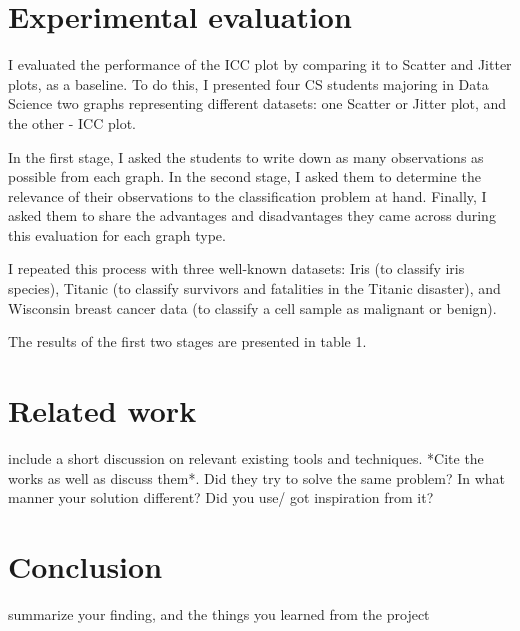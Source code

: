 \documentclass[12pt]{article}
\begin{document}
\section{Experimental evaluation}\label{Experimental evaluation}
I evaluated the performance of the ICC plot by comparing it to Scatter and Jitter plots, as a baseline. To do this, I presented four CS students majoring in Data Science two graphs representing different datasets: one Scatter or Jitter plot, and the other - ICC plot.

In the first stage, I asked the students to write down as many observations as possible from each graph. In the second stage, I asked them to determine the relevance of their observations to the classification problem at hand. Finally, I asked them to share the advantages and disadvantages they came across during this evaluation for each graph type.

I repeated this process with three well-known datasets: Iris (to classify iris species), Titanic (to classify survivors and fatalities in the Titanic disaster), and Wisconsin breast cancer data (to classify a cell sample as malignant or benign). 

The results of the first two stages are presented in table 1.






\section{Related work}\label{Related work}
include a short discussion on relevant existing tools and
techniques. *Cite the works as well as discuss them*. Did they try to
solve the same problem? In what manner your solution different? Did
you use/ got inspiration from it? 

\section{Conclusion}\label{Conclusion}
summarize your finding, and the things you learned from
the project



\end{document}
